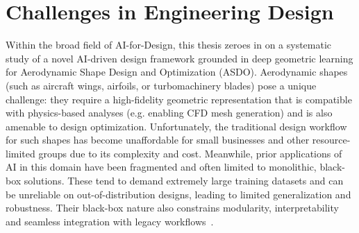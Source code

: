 \section{Challenges in Engineering Design}
Within the broad field of AI-for-Design, this thesis zeroes in on a systematic study of a novel AI-driven design framework grounded in deep geometric learning for Aerodynamic Shape Design and Optimization (ASDO). Aerodynamic shapes (such as aircraft wings, airfoils, or turbomachinery blades) pose a unique challenge: they require a high-fidelity geometric representation that is compatible with physics-based analyses (e.g. enabling CFD mesh generation) and is also amenable to design optimization. Unfortunately, the traditional design workflow for such shapes has become unaffordable for small businesses and other resource-limited groups due to its complexity and cost. Meanwhile, prior applications of AI in this domain have been fragmented and often limited to monolithic, black-box solutions. These tend to demand extremely large training datasets and can be unreliable on out-of-distribution designs, leading to limited generalization and robustness. Their black-box nature also constrains modularity, interpretability and seamless integration with legacy workflows~\cite{aa.Lupp2025}.

